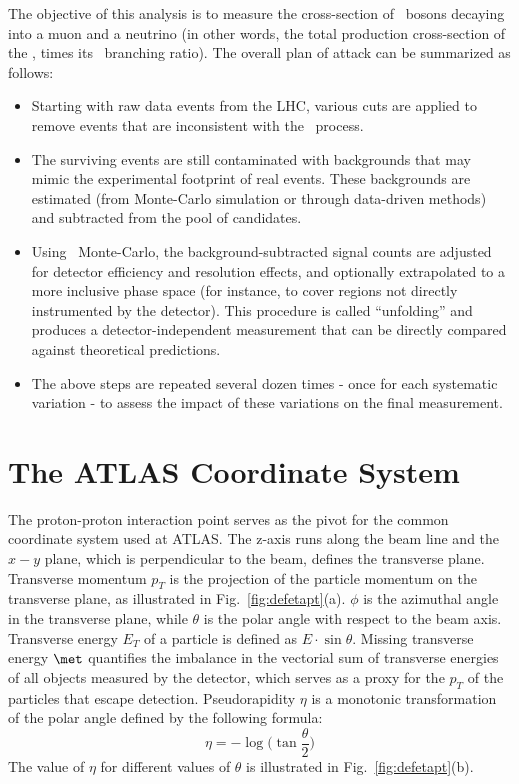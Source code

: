 \def\A{\ensuremath{A}}
\def\E{\ensuremath{E}}
\def\C{\ensuremath{C}}

\def\AW{\ensuremath{A_W}}
\def\EW{\ensuremath{E_W}}
\def\AZ{\ensuremath{A_Z}}
\def\EZ{\ensuremath{E_Z}}

\def\Wall{\ensuremath{\Wminus+\Wplus}}

The objective of this analysis is to measure the cross-section of \Wboson\ bosons decaying into a muon and a neutrino (in other words, the total production cross-section of the \Wboson, times its \Wmn\ branching ratio). The overall plan of attack can be summarized as follows:
\begin{itemize}
\item Starting with raw data events from the LHC, various cuts are applied to remove events that are inconsistent with the \Wmn\ process.
\item The surviving events are still contaminated with backgrounds that may mimic the experimental footprint of real \Wboson events. These backgrounds are estimated (from Monte-Carlo simulation or through data-driven methods) and subtracted from the pool of candidates.
\item Using \Wmn\ Monte-Carlo, the background-subtracted signal counts are adjusted for detector efficiency and resolution effects, and optionally extrapolated to a more inclusive phase space (for instance, to cover regions not directly instrumented by the detector). This procedure is called ``unfolding'' and produces a detector-independent measurement that can be directly compared against theoretical predictions.
\item The above steps are repeated several dozen times - once for each systematic variation - to assess the impact of these variations on the final measurement.
\end{itemize}

\section{The ATLAS Coordinate System}
The proton-proton interaction point serves as the pivot for the common coordinate system used at ATLAS. The z-axis runs along the beam line and the $x-y$ plane, which is perpendicular to the beam, defines the transverse plane. Transverse momentum $p_T$ is the projection of the particle momentum on the transverse plane, as illustrated in Fig.~\ref{fig:defetapt}(a). $\phi$ is the azimuthal angle in the transverse plane, while $\theta$ is the polar angle with respect to the beam axis. Transverse energy $E_T$ of a particle is defined as $E \cdot \sin \theta$. Missing transverse energy $\met$ quantifies the imbalance in the vectorial sum of transverse energies of all objects measured by the detector, which serves as a proxy for the $p_T$ of the particles that escape detection. Pseudorapidity $\eta$ is a monotonic transformation of the polar angle defined by the following formula:
$$\eta = -\log\biggl(\tan\frac{\theta}{2}\biggr)$$
The value of $\eta$ for different values of $\theta$ is illustrated in Fig.~\ref{fig:defetapt}(b).

